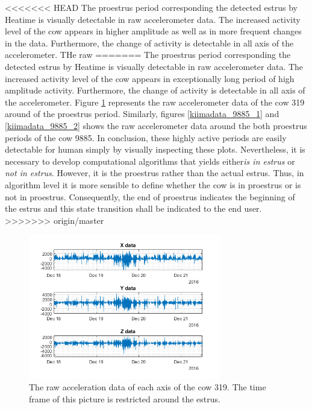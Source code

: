 \documentclass[english,12pt,a4paper,pdftex,elec,utf8]{aaltothesis}
\begin{document}
<<<<<<< HEAD
The proestrus period corresponding the detected estrus by Heatime is visually detectable in raw accelerometer data. The increased activity level of the cow appears in higher amplitude as well as in more frequent changes in the data. Furthermore, the change of activity is detectable in all axis of the accelerometer. THe raw
=======
The proestrus period corresponding the detected estrus by Heatime is visually detectable in raw accelerometer data. The increased activity level of the cow appears in exceptionally long period of high amplitude activity. Furthermore, the change of activity is detectable in all axis of the accelerometer. Figure \ref{kiimadata_319} represents the raw accelerometer data of the cow 319 around of the proestrus period. Similarly, figures \ref{kiimadata_9885_1} and \ref{kiimadata_9885_2} shows the raw accelerometer data around the both proestrus periods of the cow 9885. In conclusion, these highly active periods are easily detectable for human simply by visually inspecting these plots. Nevertheless, it is necessary to develop computational algorithms that yields either\textit{is in estrus} or \textit{not in estrus}. However, it is the proestrus rather than the actual estrus. Thus, in algorithm level it is more sensible to define whether the cow is in proestrus or is not in proestrus. Consequently, the end of proestrus indicates the beginning of the estrus and this state transition shall be indicated to the end user.
>>>>>>> origin/master



\begin{figure}[htb]
\centering
\includegraphics[width = 0.75\textwidth]{figures/kiimadata_319.png}
\caption{The raw acceleration data of each axis of the cow 319. The time frame of this picture is restricted around the estrus.}
\label{kiimadata_319}
\end{figure}
\end{document}
